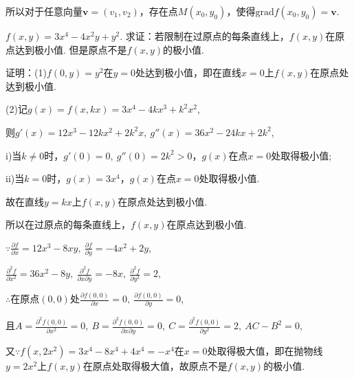 \documentclass[12pt,UTF8]{ctexart}
\begin{document}
\begin{enumerate}
所以对于任意向量$\bm v=(v_1,v_2)$，存在点$M(x_0,y_0)$，使得$\mathrm{grad}f(x_0,y_0)=\bm v$.

$f(x,y)=3x^4-4x^2y+y^2$. 求证：若限制在过原点的每条直线上，$f(x,y)$在原点达到极小值. 但是原点不是$f(x,y)$的极小值.

证明：(1)$f(0,y)=y^2$在$y=0$处达到极小值，即在直线$x=0$上$f(x,y)$在原点处达到极小值.

(2)记$g(x)=f(x,kx)=3x^4-4kx^3+k^2x^2$,

则$g'(x)=12x^3-12kx^2+2k^2x,\ g''(x)=36x^2-24kx+2k^2$,

i)当$k\neq0$时，$g'(0)=0,\ g''(0)=2k^2>0$，$g(x)$在点$x=0$处取得极小值;

ii)当$k=0$时，$g(x)=3x^4$，$g(x)$在点$x=0$处取得极小值.

故在直线$y=kx$上$f(x,y)$在原点处达到极小值.

所以在过原点的每条直线上，$f(x,y)$在原点达到极小值.

$\because\frac{\partial f}{\partial x}=12x^3-8xy,\ \frac{\partial f}{\partial y}=-4x^2+2y$,

$\frac{\partial^2f}{\partial x^2}=36x^2-8y,\ \frac{\partial^2f}{\partial x\partial y}=-8x,\ \frac{\partial^2f}{\partial y^2}=2$,

$\therefore$在原点$(0,0)$处$\frac{\partial f(0,0)}{\partial x}=0,\ \frac{\partial f(0,0)}{\partial y}=0$,

且$A=\frac{\partial^2f(0,0)}{\partial x^2}=0,\ B=\frac{\partial^2f(0,0)}{\partial x\partial y}=0,\ C=\frac{\partial^2f(0,0)}{\partial y^2}=2,\ AC-B^2=0$,

又$\because f(x,2x^2)=3x^4-8x^4+4x^4=-x^4$在$x=0$处取得极大值，即在抛物线$y=2x^2$上$f(x,y)$在原点处取得极大值，故原点不是$f(x,y)$的极小值.
\end{enumerate}
\end{document}
